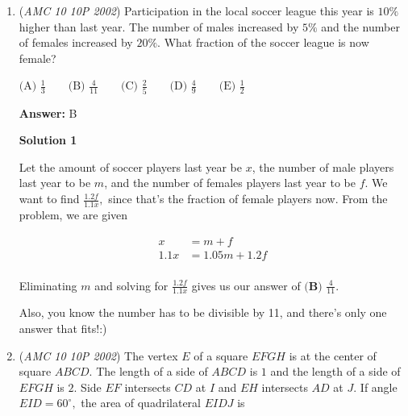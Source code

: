 \begin{enumerate}
 Thus, our answer is $\boxed{\textbf{(C) }\text{ III and IV only}}.$




\textbf{Solution 2}

This is the much more realistic and less-time-consuming approach.Notice that all answer choices except $\text{(C)}$ include $\text{II}.$ in them. Therefore, it is sufficient to prove that $\text{II}.$ is false. Similar to solution 1, a quick glance tells us:

 $\text{II. } f_{11}(a)f_{13}(a)f_{14}(a)$
$f_{11}(a)f_{13}(a)f_{14}(a) =a^{11}a^{13}a^{14} =a^{38} \neq a^{2002}$

 Therefore, by process of elimination, our answer is $\boxed{\textbf{(C) }\text{ III and IV only}}.$



	\item (\textit{AMC 10 10P 2002}) Participation in the local soccer league this year is $10\%$ higher than last year. The number of males increased by $5\%$ and the number of females increased by $20\%$. What fraction of the soccer league is now female?


 $\text{(A) }\frac{1}{3} \qquad \text{(B) }\frac{4}{11} \qquad \text{(C) }\frac{2}{5} \qquad \text{(D) }\frac{4}{9} \qquad \text{(E) }\frac{1}{2}$

 \textbf{Answer: }B



\textbf{Solution 1}

Let the amount of soccer players last year be $x$, the number of male players last year to be $m$, and the number of females players last year to be $f.$ We want to find $\frac{1.2f}{1.1x},$ since that's the fraction of female players now. From the problem, we are given 

 \begin{align*}x&=m+f \\1.1x&=1.05m+1.2f \\\end{align*}


 Eliminating $m$ and solving for $\frac{1.2f}{1.1x}$ gives us our answer of $\boxed{\textbf{(B) } \frac {4}{11}}.$

 Also, you know the number has to be divisible by 11, and there’s only one answer that fits!:)

 


	\item (\textit{AMC 10 10P 2002}) The vertex $E$ of a square $EFGH$ is at the center of square $ABCD.$ The length of a side of $ABCD$ is $1$ and the length of a side of $EFGH$ is $2.$ Side $EF$ intersects $CD$ at $I$ and $EH$ intersects $AD$ at $J.$ If angle $EID=60^{\circ},$ the area of quadrilateral $EIDJ$ is



\end{enumerate}
